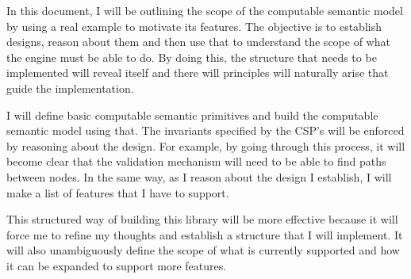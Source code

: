 In this document, I will be outlining the scope of the computable semantic model by using a real example to motivate its features. The objective is to establish designs, reason about them and then use that to understand the scope of what the engine must be able to do. By doing this, the structure that needs to be implemented will reveal itself and there will principles will naturally arise that guide the implementation.

I will define basic computable semantic primitives and build the computable semantic model using that. The invariants specified by the CSP's will be enforced by reasoning about the design. For example, by going through this process, it will become clear that the validation mechanism will need to be able to find paths between nodes. In the same way, as I reason about the design I establish, I will make a list of features that I have to support.

This structured way of building this library will be more effective because it will force me to refine my thoughts and establish a structure that I will implement. It will also unambiguously define the scope of what is currently supported and how it can be expanded to support more features.